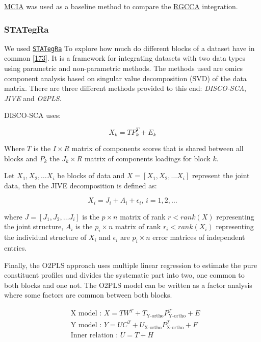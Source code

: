 \documentclass[
  12pt,
  a4paper,
  twoside,
  openright]{book}
\begin{document}
\protect\hyperlink{acronyms_MCIA}{MCIA} was used as a baseline method to compare the \protect\hyperlink{acronyms_RGCCA}{RGCCA} integration.

\hypertarget{stategra}{%
\subsubsection{STATegRa}\label{stategra}}

We used \href{https://bioconductor.org/packages/STATegRa}{\texttt{STATegRa}} To explore how much do different blocks of a dataset have in common {[}\protect\hyperlink{ref-planell2021}{173}{]}.
It is a framework for integrating datasets with two data types using parametric and non-parametric methods.
The methods used are omics component analysis based on singular value decomposition (SVD) of the data matrix.
There are three different methods provided to this end: \emph{DISCO-SCA}, \emph{JIVE} and \emph{O2PLS}.

DISCO-SCA uses:

\[
X_k = TP_k ^ T + E_k
\]

Where \(T\) is the \(I \times R\) matrix of components scores that is shared between all blocks and \(P_k\) the \(J_k \times R\) matrix of components loadings for block \(k\).

Let \(X_1,X_2, \dots X_i\) be blocks of data and \(X=[X_1,X_2, \dots X_i]\) represent the joint data, then the JIVE decomposition is defined as:

\[X_i=J_i+A_i+\epsilon_i \text{, }i = 1,2, \dots\]

where \(J=[J_1,J_2, \dots J_i]\) is the \(p \times n\) matrix of rank \(r<rank(X)\) representing the joint structure, \(A_i\) is the \(p_i\times n\) matrix of rank \(r_i < rank(X_i)\) representing the individual structure of \(X_i\) and \(\epsilon_i\) are \(p_i \times n\) error matrices of independent entries.

Finally, the O2PLS approach uses multiple linear regression to estimate the pure constituent profiles and divides the systematic part into two, one common to both blocks and one not.
The O2PLS model can be written as a factor analysis where some factors are common between both blocks.

\[
\begin{aligned}
& \text{X model : } X = TW ^ T + T_{\text{Y-ortho}} P ^ T_{\text{Y-ortho}} + E \\
& \text{Y model : } Y = UC ^ T + U_{\text{X-ortho}} P ^ T_{\text{X-ortho}} + F \\
& \text{Inner relation : } U = T + H
\end{aligned}
\]
\end{document}
